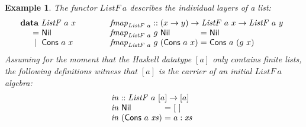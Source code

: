 \documentclass{jfp1}
\newtheorem{example}{Example}
\newcommand{\kw}[1]{\textbf{#1}}
\begin{document}
\begin{example}
  The functor $\mathit{ListF}~a$ describes the individual layers of a
  list:
  \begin{displaymath}
    \begin{array}{@{}l@{\hspace{3em}}l}
      \begin{array}{l}
        \kw{data}~\mathit{ListF}~a~x \\
        \quad
        \begin{array}{c@{\hspace{0.3em}}l}
          = & \mathsf{Nil} \\
          | & \mathsf{Cons}~a~x
        \end{array}
      \end{array}
      &
      \begin{array}{l}
        \mathit{fmap}_{\mathit{ListF}~a} :: (x \to y) \to \mathit{ListF}~a~x \to \mathit{ListF}~a~y \\
        \begin{array}{@{}l@{\hspace{0.3em}}l@{\hspace{0.3em}}l@{\hspace{0.3em}}c@{\hspace{0.3em}}l}
          \mathit{fmap}_{\mathit{ListF}~a}&g&\mathsf{Nil} &=& \mathsf{Nil} \\
          \mathit{fmap}_{\mathit{ListF}~a}&g&(\mathsf{Cons}~a~x) &=& \mathsf{Cons}~a~(g~x)
        \end{array}
      \end{array}
    \end{array}
  \end{displaymath}
  Assuming for the moment that the Haskell datatype $[a]$ only
  contains \emph{finite} lists, the following definitions witness that
  $[a]$ is the carrier of an initial $\mathit{ListF}~a$ algebra:
  \begin{displaymath}
    \begin{array}{l}
      \mathit{in} :: \mathit{ListF}~a~[a] \to [a] \\
      \begin{array}{@{}l@{\hspace{0.3em}}l@{\hspace{0.3em}}c@{\hspace{0.3em}}l}
        \mathit{in}&\mathsf{Nil} &=& [~] \\
        \mathit{in}&(\mathsf{Cons}~a~\mathit{xs}) &=& a : \mathit{xs}
      \end{array}

\end{array}
\end{displaymath}
\end{example}
\end{document}
